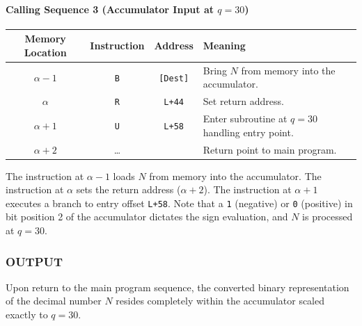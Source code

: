 \paragraph{Calling Sequence 3 (Accumulator Input at $q=30$)}
\begin{table}[h!]
\centering
\begin{tabularx}{\textwidth}{cccX}
\toprule
\textbf{Memory Location} & \textbf{Instruction} & \textbf{Address} & \textbf{Meaning} \\
\midrule
$\alpha-1$   & \texttt{B} & \texttt{[Dest]} & Bring $N$ from memory into the accumulator. \\
$\alpha$     & \texttt{R} & \texttt{L+44}   & Set return address. \\
$\alpha+1$   & \texttt{U} & \texttt{L+58}   & Enter subroutine at $q=30$ handling entry point. \\
$\alpha+2$   & \dots      &                  & Return point to main program. \\
\bottomrule
\end{tabularx}
\end{table}
The instruction at $\alpha-1$ loads $N$ from memory into the accumulator. The instruction at $\alpha$ sets the return address ($\alpha+2$). The instruction at $\alpha+1$ executes a branch to entry offset \texttt{L+58}. Note that a \texttt{1} (negative) or \texttt{0} (positive) in bit position 2 of the accumulator dictates the sign evaluation, and $N$ is processed at $q=30$.

\subsubsection*{OUTPUT}
Upon return to the main program sequence, the converted binary representation of the decimal number $N$ resides completely within the accumulator scaled exactly to $q=30$.

